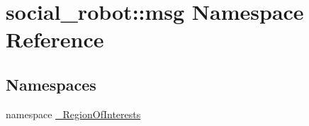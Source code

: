 \hypertarget{namespacesocial__robot_1_1msg}{
\section{social\_\-robot::msg Namespace Reference}
\label{namespacesocial__robot_1_1msg}
}
\subsection*{Namespaces}
\begin{DoxyCompactItemize}
\item 
namespace \hyperlink{namespacesocial__robot_1_1msg_1_1__RegionOfInterests}{\_\-RegionOfInterests}
\end{DoxyCompactItemize}
